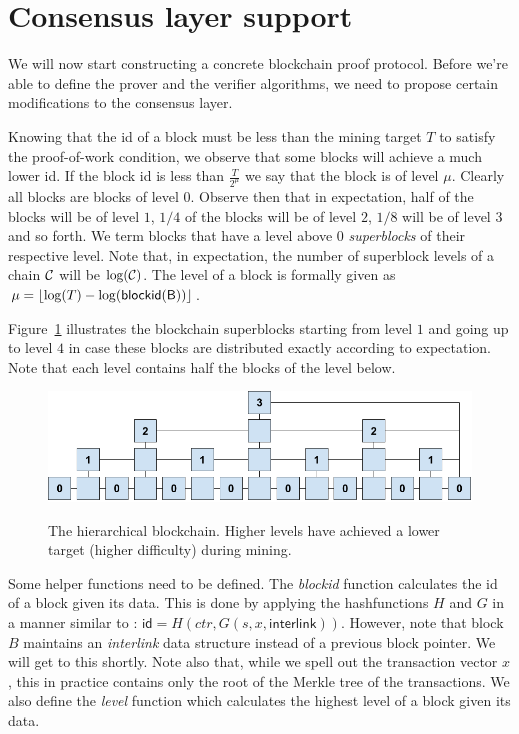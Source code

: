 \section{Consensus layer support}

We will now start constructing a concrete blockchain proof protocol. Before
we're able to define the prover and the verifier algorithms, we need to propose
certain modifications to the consensus layer.

Knowing that the id of a block must be less than the mining target $T$ to
satisfy the proof-of-work condition, we observe that some blocks will achieve a
much lower id. If the block id is less than $\frac{T}{2^\mu}$ we say that the
block is of level $\mu$. Clearly all blocks are blocks of level $0$. Observe
then that in expectation, half of the blocks will be of level $1$, $1/4$ of the
blocks will be of level $2$, $1/8$ will be of level $3$ and so forth. We term
blocks that have a level above 0 \textit{superblocks} of their respective
level. Note that, in expectation, the number of superblock levels of a chain
$\mathcal{C}$ will be $\log(\mathcal{C})$. The level of a block is formally given as $\mu
= \left \lfloor \log(T) - \log(\sf{blockid}(B)) \right \rfloor$.

Figure~\ref{fig.hierarchy} illustrates the blockchain superblocks starting from
level $1$ and going up to level $4$ in case these blocks are distributed
exactly according to expectation. Note that each level contains half the blocks
of the level below.

\begin{figure}
    \caption{The hierarchical blockchain.
    Higher levels have achieved a lower target (higher difficulty) during mining.}
    \centering
    \includegraphics[width=\columnwidth,keepaspectratio]{figures/hierarchical-ledger.png}
    \label{fig.hierarchy}
\end{figure}

Some helper functions need to be defined. The \textit{blockid} function
calculates the id of a block given its data. This is done by applying the
hashfunctions $H$ and $G$ in a manner similar to \cite{backbone}:
$\textsf{id} = H(ctr, G(s, x, \textsf{interlink}))$. However, note that block
$B$ maintains an \textit{interlink} data structure instead of a previous block
pointer. We will get to this shortly. Note also that, while we spell out the
transaction vector $x$, this in practice contains only the root of the Merkle
tree of the transactions. We also define the \textit{level} function which
calculates the highest level of a block given its data.

